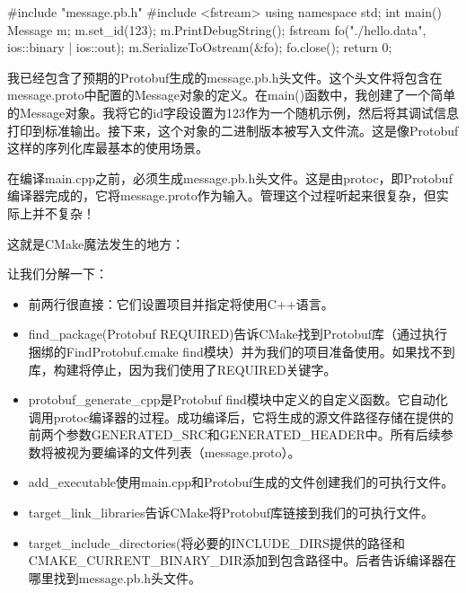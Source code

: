 
\begin{cpp}
#include "message.pb.h"
#include <fstream>
using namespace std;
int main()
{
    Message m;
    m.set_id(123);
    m.PrintDebugString();
    fstream fo("./hello.data", ios::binary | ios::out);
    m.SerializeToOstream(&fo);
    fo.close();
    return 0;
}
\end{cpp}

我已经包含了预期的Protobuf生成的message.pb.h头文件。这个头文件将包含在message.proto中配置的Message对象的定义。在main()函数中，我创建了一个简单的Message对象。我将它的id字段设置为123作为一个随机示例，然后将其调试信息打印到标准输出。接下来，这个对象的二进制版本被写入文件流。这是像Protobuf这样的序列化库最基本的使用场景。

在编译main.cpp之前，必须生成message.pb.h头文件。这是由protoc，即Protobuf编译器完成的，它将message.proto作为输入。管理这个过程听起来很复杂，但实际上并不复杂！

这就是CMake魔法发生的地方：



让我们分解一下：

\begin{itemize}
\item
前两行很直接：它们设置项目并指定将使用C++语言。

\item
find\_package(Protobuf REQUIRED)告诉CMake找到Protobuf库（通过执行捆绑的FindProtobuf.cmake find模块）并为我们的项目准备使用。如果找不到库，构建将停止，因为我们使用了REQUIRED关键字。

\item
protobuf\_generate\_cpp是Protobuf find模块中定义的自定义函数。它自动化调用protoc编译器的过程。成功编译后，它将生成的源文件路径存储在提供的前两个参数GENERATED\_SRC和GENERATED\_HEADER中。所有后续参数将被视为要编译的文件列表（message.proto）。

\item
add\_executable使用main.cpp和Protobuf生成的文件创建我们的可执行文件。

\item
target\_link\_libraries告诉CMake将Protobuf库链接到我们的可执行文件。

\item
target\_include\_directories(将必要的INCLUDE\_DIRS提供的路径和CMAKE\_CURRENT\_BINARY\_DIR添加到包含路径中。后者告诉编译器在哪里找到message.pb.h头文件。
\end{itemize}

